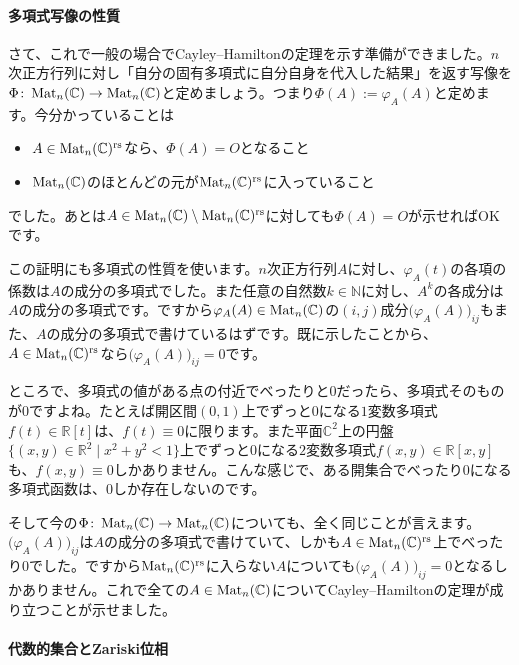 \paragraph{多項式写像の性質}

さて、これで一般の場合でCayley--Hamiltonの定理を示す準備ができました。$n$次正方行列に対し「自分の固有多項式に自分自身を代入した結果」を返す写像を$\Phi\colon \operatorname{Mat}_n(\mathbb{C}) \rightarrow \operatorname{Mat}_n(\mathbb{C})$と定めましょう。つまり$\Phi(A) := \varphi_A(A)$と定めます。今分かっていることは
\begin{itemize}
\item $A \in \operatorname{Mat}_n(\mathbb{C})^{\text{rs}}$なら、$\Phi(A) = O$となること
\item $\operatorname{Mat}_n(\mathbb{C})$のほとんどの元が$\operatorname{Mat}_n(\mathbb{C})^{\text{rs}}$に入っていること
\end{itemize}
でした。あとは$A \in \operatorname{Mat}_n(\mathbb{C}) \setminus \operatorname{Mat}_n(\mathbb{C})^{\text{rs}}$に対しても$\Phi(A) = O$が示せればOKです。

この証明にも多項式の性質を使います。$n$次正方行列$A$に対し、$\varphi_A(t)$の各項の係数は$A$の成分の多項式でした。また任意の自然数$k \in \mathbb{N}$に対し、$A^k$の各成分は$A$の成分の多項式です。ですから$\varphi_A(A) \in \operatorname{Mat}_n(\mathbb{C})$の$(i, j)$成分$\bigl(\varphi_A(A)\bigr)_{ij}$もまた、$A$の成分の多項式で書けているはずです。既に示したことから、$A \in \operatorname{Mat}_n(\mathbb{C})^{\text{rs}}$なら$\bigl(\varphi_A(A)\bigr)_{ij} = 0$です。

ところで、多項式の値がある点の付近でべったりと$0$だったら、多項式そのものが$0$ですよね。たとえば開区間$(0, 1)$上でずっと$0$になる$1$変数多項式$f(t) \in \mathbb{R}[t]$は、$f(t) \equiv 0$に限ります。また平面$\mathbb{C}^2$上の円盤$\{(x, y) \in \mathbb{R}^2 \mid x^2 + y^2 < 1\}$上でずっと$0$になる$2$変数多項式$f(x, y) \in \mathbb{R}[x, y]$も、$f(x, y) \equiv 0$しかありません。こんな感じで、ある開集合でべったり$0$になる多項式函数は、$0$しか存在しないのです。

そして今の$\Phi \colon \operatorname{Mat}_n(\mathbb{C}) \rightarrow \operatorname{Mat}_n(\mathbb{C})$についても、全く同じことが言えます。$\bigl(\varphi_A(A)\bigr)_{ij}$は$A$の成分の多項式で書けていて、しかも$A \in \operatorname{Mat}_n(\mathbb{C})^{\text{rs}}$上でべったり$0$でした。ですから$\operatorname{Mat}_n(\mathbb{C})^{\text{rs}}$に入らない$A$についても$\bigl(\varphi_A(A)\bigr)_{ij} = 0$となるしかありません。これで全ての$A \in \operatorname{Mat}_n(\mathbb{C})$についてCayley--Hamiltonの定理が成り立つことが示せました。

\paragraph{代数的集合とZariski位相}

